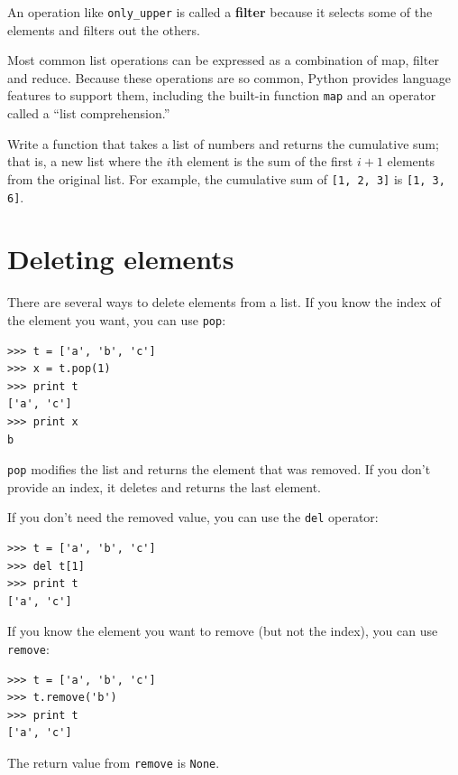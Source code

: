 \documentclass[10pt]{book}
\begin{document}
An operation like \verb"only_upper" is called a {\bf filter} because
it selects some of the elements and filters out the others.

Most common list operations can be expressed as a combination
of map, filter and reduce.  Because these operations are
so common, Python provides language features to support them,
including the built-in function {\tt map} and an operator
called a ``list comprehension.''

\begin{exercise}
\label{cumulative}

Write a function that takes a list of numbers and returns the
cumulative sum; that is, a new list where the $i$th element
is the sum of the first $i+1$ elements from the original list.
For example, the cumulative sum of {\tt [1, 2, 3]} is
{\tt [1, 3, 6]}.
\end{exercise}


\section{Deleting elements}

There are several ways to delete elements from a list.  If you
know the index of the element you want, you can use
{\tt pop}:

\begin{verbatim}
>>> t = ['a', 'b', 'c']
>>> x = t.pop(1)
>>> print t
['a', 'c']
>>> print x
b
\end{verbatim}
%
{\tt pop} modifies the list and returns the element that was removed.
If you don't provide an index, it deletes and returns the
last element.

If you don't need the removed value, you can use the {\tt del}
operator:

\begin{verbatim}
>>> t = ['a', 'b', 'c']
>>> del t[1]
>>> print t
['a', 'c']
\end{verbatim}
%

If you know the element you want to remove (but not the index), you
can use {\tt remove}:

\begin{verbatim}
>>> t = ['a', 'b', 'c']
>>> t.remove('b')
>>> print t
['a', 'c']
\end{verbatim}
%
The return value from {\tt remove} is {\tt None}.
\end{document}
